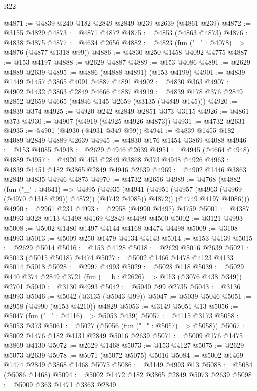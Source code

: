 \begin{lexlean}{R22}
\begin{coremodule}
@4871 := @4839 @240 @182 @2849 @2849 @239 @2639 (@4861 @239)
@4872 := @3155 @4829
@4873 := @4871 @4872
@4875 := @4853 (@4863 @4873)
@4876 := @4838 @4875
@4877 := @4634 @2656
@4882 := @4823 (fun ("_" : @4078) => @4876 (@4877 @1318 @99))
@4886 := @4830 @250 @1458 @4092 @4775
@4887 := @153 @4197
@4888 := @2629 @4887
@4889 := @153 @4086
@4891 := @2629 @4889 @2639
@4895 := @4886 (@4888 @4891) (@153 @4199)
@4901 := @4839 @1449 @1457 @3865 @4091 @4887 @4891
@4902 := @4830 @363
@4907 := @4902 @1432 @3863 @2849 @4666 @4887
@4919 := @4839 @178 @376 @2849 @2852 @2659 @4665 (@4846 @145 @2659 (@3135 (@4849 @145)))
@4920 := @4839 @374
@4925 := @4920 @242 @2849 @2851 @373 @3115
@4926 := @4861 @373
@4930 := @4907 (@4919 (@4925 @4926 @4873))
@4931 := @4732 @2631
@4935 := @4901 (@4930 (@4931 @349 @99))
@4941 := @4839 @1455 @182 @4089 @2849 @4889 @2639
@4945 := @4830 @176 @1454 @3869 @4088
@4946 := @153 @4085
@4948 := @2629 @4946 @2639
@4951 := @4945 (@4664 @4948) @4889
@4957 := @4920 @1453 @2849 @3868 @373 @4948 @4926
@4963 := @4839 @1451 @182 @3865 @2849 @4946 @2639
@4969 := @4902 @1446 @3863 @2849 @4835 @4946 @4875
@4970 := @4732 @2656
@4989 := @4768
    (@4882
      (fun ("_" : @4641) =>
      @4895
        (@4935 (@4941 (@4951 (@4957 (@4963 (@4969 (@4970 @1318 @99)) @4872)) (@4742 @4085)) @4872))
        (@4749 @4197 @4086)))
@4990 := @2961 @231
@4993 := @2958 (@4990 @4493) @4759
@5001 := @4387 @4993 @328 @113 @1498 @4169 @2849 @4499 @4500
@5002 := @3121 @4993
@5008 := @5002 @1480 @1497 @4144 @4168 @4474 @4498
@5009 := @3108 @4993
@5013 := @5009 @250 @1479 @4134 @4143
@5014 := @153 @4139
@5015 := @2629 @5014
@5016 := @153 @4128
@5018 := @2629 @5016 @2639
@5021 := @5013 (@5015 @5018) @4474
@5027 := @5002 @1466 @1478 @4123 @4133 @5014 @5018
@5028 := @2997 @4993
@5029 := @5028 @118
@5039 := @5029 @440 @374 @2849 @3721 (fun (__b : @2626) => @153 (@3076 @438 @349)) @2701
@5040 := @3130 @4993
@5042 := @5040 @99 @2735
@5043 := @3136 @4993
@5046 := @5042 (@3135 (@5043 @99))
@5047 := @5039 @5046
@5051 := @2958 (@4990 (@153 @4200)) @4829
@5053 := @3149 @5051 @13
@5056 := @5047 (fun ("_" : @4116) => @5053 @439)
@5057 := @4115 @3173
@5058 := @5053 @373
@5061 := @5027 (@5056 (fun ("_" : @5057) => @5058))
@5067 := @5002 @1476 @182 @4131 @2849 @5016 @2639
@5071 := @5009 @176 @1475 @3869 @4130
@5072 := @2629 @1468
@5073 := @153 @4127
@5075 := @2629 @5073 @2639
@5078 := @5071 (@5072 @5075) @5016
@5084 := @5002 @1469 @1474 @2849 @3868 @1468 @5075
@5086 := @3149 @4993 @13
@5088 := @5084 (@5086 @1468)
@5094 := @5002 @1472 @182 @3865 @2849 @5073 @2639
@5098 := @5009 @363 @1471 @3863 @2849

\end{coremodule}
\end{lexlean}
